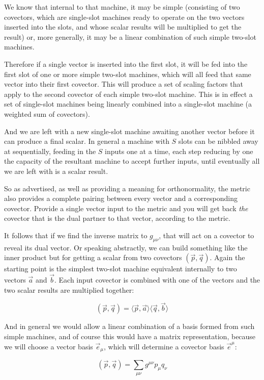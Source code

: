 We know that internal to that machine, it may be simple (consisting of two covectors, which are single-slot machines ready to operate on the two vectors inserted into the slots, and whose scalar results will be multiplied to get the result) or, more generally, it may be a linear combination of such simple two-slot machines.

Therefore if a single vector is inserted into the first slot, it will be fed into the first slot of one or more simple two-slot machines, which will all feed that same vector into their first covector. This will produce a set of scaling factors that apply to the second covector of each simple two-slot machine. This is in effect a set of single-slot machines being linearly combined into a single-slot machine (a weighted sum of covectors).

And we are left with a new single-slot machine awaiting another vector before it can produce a final scalar. In general a machine with $S$ slots can be nibbled away at sequentially, feeding in the $S$ inputs one at a time, each step reducing by one the capacity of the resultant machine to accept further inputs, until eventually all we are left with is a scalar result.

So as advertised, as well as providing a meaning for orthonormality, the metric also provides a complete pairing between every vector and a corresponding covector. Provide a single vector input to the metric and you will get back \textit{the} covector that is the dual partner to that vector, according to the metric.

It follows that if we find the inverse matrix to $g_{\mu\nu}$, that will act on a covector to reveal its dual vector. Or speaking abstractly, we can build something like the inner product but for getting a scalar from two covectors $(\vec{p}, \vec{q})$. Again the starting point is the simplest two-slot machine equivalent internally to two vectors $\vec{a}$ and $\vec{b}$. Each input covector is combined with one of the vectors and the two scalar results are multiplied together:

$$
(\vec{p}, \vec{q}) =
\langle \vec{p}, \vec{a} \rangle
\langle \vec{q}, \vec{b} \rangle
$$

And in general we would allow a linear combination of a basis formed from such simple machines, and of course this would have a matrix representation, because we will choose a vector basis $\vec{e}_{\mu}$, which will determine a covector basis $\vec{e}^{\mu}$:

$$
(\vec{p},\vec{q}) = \sum_{\mu\nu} g^{\mu\nu} p_{\mu} q_{\nu} 
$$

